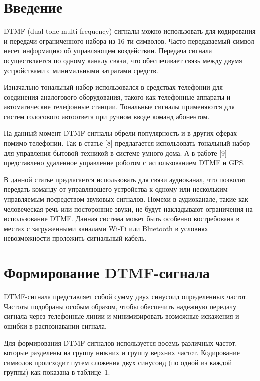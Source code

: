 \documentclass[a4paper,10pt,twoside]{article}
\begin{document}
\begin{multicols}{2} %

\section*{Введение}

DTMF (dual-tone multi-frequency) сигналы можно использовать для кодирования и передачи ограниченного набора из 16-ти символов. Часто передаваемый символ несет информацию об управляющем воздействии. Передача сигнала осуществляется по одному каналу связи, что обеспечивает связь между двумя устройствами с минимальными затратами средств. %

Изначально тональный набор использовался в средствах телефонии для соединения аналогового оборудования, такого как телефонные аппараты и автоматические телефонные станции. Тональные сигналы применяются для систем голосового автоответа при ручном вводе команд абонентом.

На данный момент DTMF-сигналы обрели популярность и в других сферах помимо телефонии. Так в статье [8] предлагается использовать тональный набор для управления бытовой техникой в системе умного дома. А в работе [9] представлено удаленное управление роботом с использованием DTMF и GPS.

В данной статье предлагается использовать для связи аудиоканал, что позволит передать команду от управляющего устройства к одному или нескольким управляемым посредством звуковых сигналов. Помехи в аудиоканале, такие как человеческая речь или посторонние звуки, не будут накладывают ограничения на использование DTMF. Данная система может быть особенно востребована в местах с загруженными каналами Wi-Fi или Bluetooth в условиях невозможности проложить сигнальный кабель.

\section{Формирование DTMF-сигнала}

DTMF-сигнала представляет собой сумму двух синусоид определенных частот. Частоты подобраны особым образом, чтобы обеспечить надежную передачу сигнала через телефонные линии и минимизировать возможные искажения и ошибки в распознавании сигнала.

Для формирования DTMF-сигналов используется восемь различных частот, которые разделены на группу нижних и группу верхних частот. Кодирование символов происходит путем сложения двух синусоид (по одной из каждой группы) как показана в таблице~1. 


\end{multicols}
\end{document}
